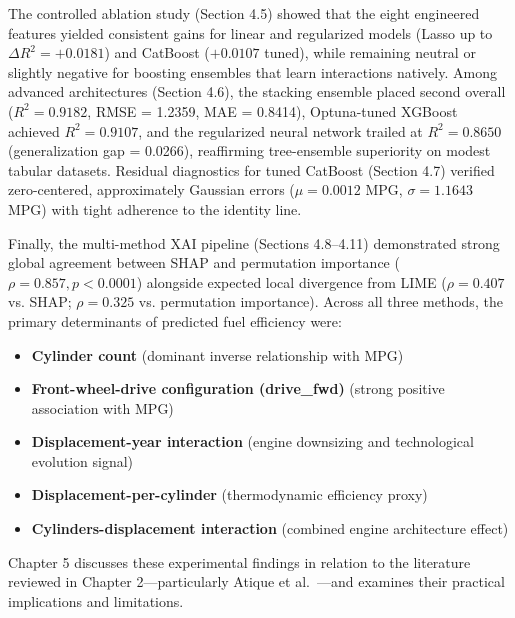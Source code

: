 The controlled ablation study (Section 4.5) showed that the eight engineered features yielded consistent gains for linear and regularized models (Lasso up to \(\Delta R^2 = +0.0181\)) and CatBoost (\(+0.0107\) tuned), while remaining neutral or slightly negative for boosting ensembles that learn interactions natively. Among advanced architectures (Section 4.6), the stacking ensemble placed second overall (\(R^2 = 0.9182\), RMSE = 1.2359, MAE = 0.8414), Optuna-tuned XGBoost achieved \(R^2 = 0.9107\), and the regularized neural network trailed at \(R^2 = 0.8650\) (generalization gap = 0.0266), reaffirming tree-ensemble superiority on modest tabular datasets. Residual diagnostics for tuned CatBoost (Section 4.7) verified zero-centered, approximately Gaussian errors (\(\mu = 0.0012\) MPG, \(\sigma = 1.1643\) MPG) with tight adherence to the identity line.

Finally, the multi-method XAI pipeline (Sections 4.8--4.11) demonstrated strong global agreement between SHAP and permutation importance (\(\rho = 0.857, p < 0.0001\)) alongside expected local divergence from LIME (\(\rho = 0.407\) vs. SHAP; \(\rho = 0.325\) vs. permutation importance). Across all three methods, the primary determinants of predicted fuel efficiency were:
\begin{itemize}
    \item \textbf{Cylinder count} (dominant inverse relationship with MPG)
    \item \textbf{Front-wheel-drive configuration (drive\_fwd)} (strong positive association with MPG)
    \item \textbf{Displacement-year interaction} (engine downsizing and technological evolution signal)
    \item \textbf{Displacement-per-cylinder} (thermodynamic efficiency proxy)
    \item \textbf{Cylinders-displacement interaction} (combined engine architecture effect)
\end{itemize}
Chapter 5 discusses these experimental findings in relation to the literature reviewed in Chapter 2---particularly Atique et al.~\cite{atique2026explainable}---and examines their practical implications and limitations.
